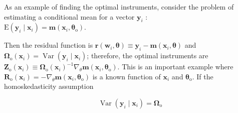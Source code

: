 \documentclass[10pt]{article}
\begin{document}
As an example of finding the optimal instruments, consider the problem of estimating a conditional mean for a vector $\mathbf{y}_{i}$ :\\
$\mathrm{E}\left(\mathbf{y}_{i} \mid \mathbf{x}_{i}\right)=\mathbf{m}\left(\mathbf{x}_{i}, \boldsymbol{\theta}_{\mathrm{o}}\right)$.

Then the residual function is $\mathbf{r}\left(\mathbf{w}_{i}, \boldsymbol{\theta}\right) \equiv \mathbf{y}_{i}-\mathbf{m}\left(\mathbf{x}_{i}, \boldsymbol{\theta}\right)$ and $\boldsymbol{\Omega}_{\mathrm{o}}\left(\mathbf{x}_{i}\right)=\operatorname{Var}\left(\mathbf{y}_{i} \mid \mathbf{x}_{i}\right)$; therefore, the optimal instruments are $\mathbf{Z}_{\mathrm{o}}\left(\mathbf{x}_{i}\right) \equiv \boldsymbol{\Omega}_{\mathrm{o}}\left(\mathbf{x}_{i}\right)^{-1} \nabla_{\theta} \mathbf{m}\left(\mathbf{x}_{i}, \boldsymbol{\theta}_{\mathrm{o}}\right)$. This is an important example where $\mathbf{R}_{\mathrm{o}}\left(\mathbf{x}_{i}\right)=-\nabla_{\theta} \mathbf{m}\left(\mathbf{x}_{i}, \boldsymbol{\theta}_{\mathrm{o}}\right)$ is a known function of $\mathbf{x}_{i}$ and $\boldsymbol{\theta}_{\mathrm{o}}$. If the homoskedasticity assumption


\begin{equation*}
\operatorname{Var}\left(\mathbf{y}_{i} \mid \mathbf{x}_{i}\right)=\boldsymbol{\Omega}_{\mathrm{o}} \tag{14.62}
\end{equation*}
\end{document}
